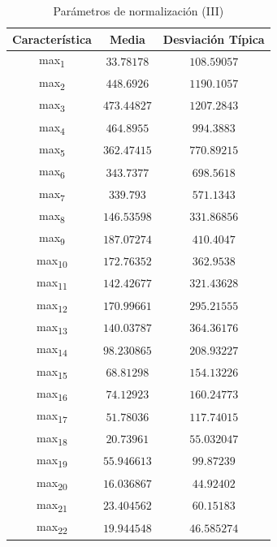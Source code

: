 \documentclass[12pt]{article}
\begin{document}
\begin{table}
	\caption{Parámetros de normalización (III)}
	\centering
		\begin{tabular}{||c c c||}
			\hline
			Característica & Media & Desviación Típica  \\ [0.5ex]
			\hline\hline
			max\textsubscript{1} & $33.78178$ & $108.59057$ \\
			\hline
			max\textsubscript{2} & $448.6926$ & $1190.1057$ \\
			\hline
			max\textsubscript{3} & $473.44827$ & $1207.2843$ \\
			\hline
			max\textsubscript{4} & $464.8955$ & $994.3883$ \\
			\hline
			max\textsubscript{5} & $362.47415$ & $770.89215$ \\
			\hline
			max\textsubscript{6} & $343.7377$ & $698.5618$ \\
			\hline
			max\textsubscript{7} & $339.793$ & $571.1343$ \\
			\hline
			max\textsubscript{8} & $146.53598$ & $331.86856$ \\
			\hline
			max\textsubscript{9} & $187.07274$ & $410.4047$ \\
			\hline
			max\textsubscript{10} & $172.76352$ & $362.9538$ \\
			\hline
			max\textsubscript{11} & $142.42677$ & $321.43628$ \\
			\hline
			max\textsubscript{12} & $170.99661$ & $295.21555$ \\
			\hline
			max\textsubscript{13} & $140.03787$ & $364.36176$ \\
			\hline
			max\textsubscript{14} & $98.230865$ & $208.93227$ \\
			\hline
			max\textsubscript{15} & $68.81298$ & $154.13226$ \\
			\hline
			max\textsubscript{16} & $74.12923$ & $160.24773$ \\
			\hline
			max\textsubscript{17} & $51.78036$ & $117.74015$ \\
			\hline
			max\textsubscript{18} & $20.73961$ & $55.032047$ \\
			\hline
			max\textsubscript{19} & $55.946613$ & $99.87239$ \\
			\hline
			max\textsubscript{20} & $16.036867$ & $44.92402$ \\
			\hline
			max\textsubscript{21} & $23.404562$ & $60.15183$ \\
			\hline
			max\textsubscript{22} & $19.944548$ & $46.585274$ \\
			\hline

\end{tabular}
\end{table}
\end{document}
